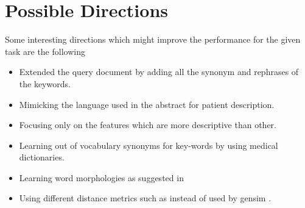\documentclass[12pt,a4paper] {article}
\begin{document}
\section*{Possible Directions}

Some interesting directions which might improve the performance for the given task are the following


\begin{itemize}
	\item Extended the query document by adding all the synonym and rephrases of the keywords. 
	\item Mimicking the language used in the abstract for patient description.
	\item Focusing only on the features which are more descriptive than other.
	\item Learning out of vocabulary synonyms for key-words by using medical dictionaries.
	\item Learning word morphologies as suggested in \cite{joulin2016bag}
	\item Using different distance metrics such as \cite{sidorov2014soft} \cite{kusner2015word} instead of \cite{annoy} used by gensim \cite{rehurek_lrec}.
	
	
\end{itemize}
\end{document}
